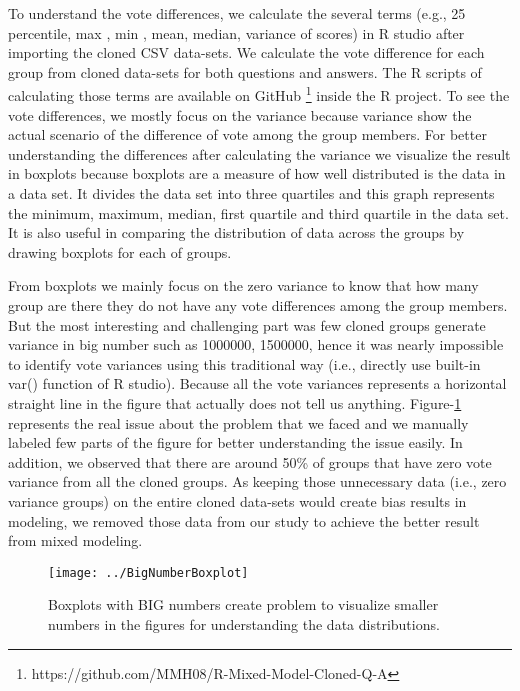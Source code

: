 \documentclass[conference]{IEEEtran}
\begin{document}
	To understand the vote differences, we calculate the several terms (e.g., 25 percentile, max , min , mean, median, variance of scores) in R studio after importing the cloned CSV data-sets. We calculate the vote difference for each group from cloned data-sets for both questions and answers. The R scripts of calculating those terms are available on GitHub \footnote{https://github.com/MMH08/R-Mixed-Model-Cloned-Q-A} inside the R project. To see the vote differences, we mostly focus on the variance because variance show the actual scenario of the difference of vote among the group members. For better understanding the differences after calculating the variance we visualize the result in boxplots because boxplots are a measure of how well distributed is the data in a data set. It divides the data set into three quartiles and this graph represents the minimum, maximum, median, first quartile and third quartile in the data set. It is also useful in comparing the distribution of data across the groups by drawing boxplots for each of groups.  
	
	
	From boxplots we mainly focus on the zero variance to know that how many group are there they do not have any vote differences among the group members. But the most interesting and challenging part was few cloned groups generate variance in big number such as 1000000, 1500000, hence it was nearly impossible to identify vote variances using this traditional way (i.e., directly use built-in var() function of R studio). Because all the vote variances represents a horizontal straight line in the figure that actually does not tell us anything. Figure-\ref{fig:bignumberboxplot} represents the real issue about the problem that we faced and we manually labeled few parts of the figure for better understanding the issue easily. In addition, we observed that there are around 50\% of groups that have zero vote variance from all the cloned groups. As keeping those unnecessary data (i.e., zero variance groups) on the entire cloned data-sets would create bias results in modeling, we removed those data from our study to achieve the better result from mixed modeling.
	
	\begin{figure}
		\centering
		\texttt{[image: ../BigNumberBoxplot]}
		\caption{Boxplots with BIG numbers create problem to visualize smaller numbers in the figures for understanding the data distributions.}
		\label{fig:bignumberboxplot}
	\end{figure}
	
\end{document}
